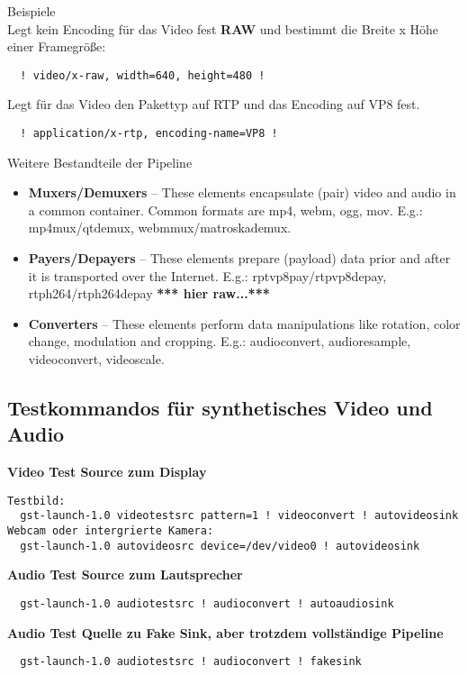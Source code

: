 Beispiele\\
Legt kein Encoding für das Video fest \textbf{RAW} und bestimmt die Breite x Höhe einer Framegröße:
\begin{verbatim}
  ! video/x-raw, width=640, height=480 !
\end{verbatim}
Legt für das Video den Pakettyp auf RTP und das Encoding auf VP8 fest.
\begin{verbatim}
  ! application/x-rtp, encoding-name=VP8 !
\end{verbatim}

Weitere Bestandteile der Pipeline
\begin{itemize}
\item \textbf{Muxers/Demuxers} – These elements encapsulate (pair) video and audio in a common container. Common formats are mp4, webm, ogg, mov.
E.g.:  mp4mux/qtdemux, webmmux/matroskademux.
\item \textbf{Payers/Depayers} – These elements prepare (payload) data prior and after it is transported over the Internet.
E.g.: rptvp8pay/rtpvp8depay,  rtph264/rtph264depay \textbf{*** hier raw...***}
\item \textbf{Converters} – These elements perform data manipulations like rotation, color change, modulation and cropping.
E.g.: audioconvert, audioresample, videoconvert, videoscale.
\end{itemize}

\subsection{Testkommandos für synthetisches Video und Audio}

\textbf{Video Test Source zum Display}
\begin{verbatim}
Testbild:
  gst-launch-1.0 videotestsrc pattern=1 ! videoconvert ! autovideosink
Webcam oder intergrierte Kamera: 
  gst-launch-1.0 autovideosrc device=/dev/video0 ! autovideosink
\end{verbatim}

\textbf{Audio Test Source zum Lautsprecher}
\begin{verbatim}
  gst-launch-1.0 audiotestsrc ! audioconvert ! autoaudiosink
\end{verbatim}

\textbf{Audio Test Quelle zu Fake Sink, aber trotzdem vollständige Pipeline}
\begin{verbatim}
  gst-launch-1.0 audiotestsrc ! audioconvert ! fakesink
\end{verbatim}


